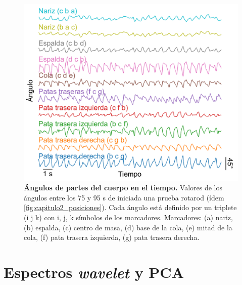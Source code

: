 \begin{appendix}
    \begin{figure}[htbp]
        \centering
        \includegraphics[width=0.6\linewidth]{figuras/capitulo2/angulos.pdf}
        \caption{\textbf{Ángulos de partes del cuerpo en el tiempo.}
            Valores de los ángulos entre los 75 y 95 s de iniciada una prueba rotarod (ídem \autoref{fig:capitulo2_posiciones}).
            Cada ángulo está definido por un triplete (i j k) con i, j, k símbolos de los marcadores.
            Marcadores: (a) nariz, (b) espalda, (c) centro de masa, (d) base de la cola, (e) mitad de la cola, (f) pata trasera izquierda, (g) pata trasera derecha.}
        \label{fig:capitulo2_angulos}
    \end{figure}

    \clearpage

    \section{Espectros \textit{wavelet} y PCA}\label{sec:apendice_pca_wavelet}


\end{appendix}
